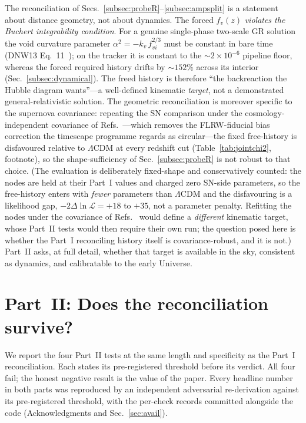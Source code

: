 \documentclass[aps,prd,twocolumn,nofootinbib,superscriptaddress,floatfix]{revtex4-2}
\newcommand{\fvz}{f_{v}(z)}
\newcommand{\Lcdm}{\Lambda\mathrm{CDM}}
\begin{document}
The reconciliation of Secs.~\ref{subsec:probeR}--\ref{subsec:ampsplit} is a
statement about distance geometry, not about dynamics. The forced $\fvz$
\emph{violates the Buchert integrability condition}. For a genuine single-phase
two-scale GR solution the void curvature parameter
$\alpha^{2}=-k_v\,f_{vi}^{2/3}$ must be constant in bare time
(DNW13 Eq.~11~\cite{Duley2013}); on the tracker it is constant to the
$\sim\!2\times10^{-6}$ pipeline floor, whereas the forced required history drifts
by $\sim\!152\%$ across its interior (Sec.~\ref{subsec:dynamical}). The freed
history is therefore ``the backreaction the Hubble diagram wants''---a
well-defined kinematic \emph{target}, not a demonstrated general-relativistic
solution. The geometric reconciliation is moreover specific to the supernova
covariance: repeating the SN comparison under the cosmology-independent covariance
of Refs.~\cite{Lane2025,Seifert2024}---which removes the FLRW-fiducial bias
correction the timescape programme regards as circular---the fixed free-history is
disfavoured relative to $\Lcdm$ at every redshift cut
(Table~\ref{tab:jointchi2}, footnote), so the shape-sufficiency of
Sec.~\ref{subsec:probeR} is not robust to that choice. (The evaluation is
deliberately fixed-shape and conservatively counted: the nodes are held at their
Part~I values and charged zero SN-side parameters, so the free-history enters
with \emph{fewer} parameters than $\Lcdm$ and the disfavouring is a likelihood
gap, $-2\Delta\ln\mathcal{L}=+18$ to $+35$, not a parameter penalty. Refitting
the nodes under the covariance of Refs.~\cite{Lane2025,Seifert2024} would define
a \emph{different} kinematic target, whose Part~II tests would then require
their own run; the question posed here is whether the Part~I reconciling
history itself is covariance-robust, and it is not.) Part~II asks, at full detail, whether that target is available in the
sky, consistent as dynamics, and calibratable to the early Universe.

\section{Part~II: Does the reconciliation survive?}
\label{sec:partii}

We report the four Part~II tests at the same length and specificity as the
Part~I reconciliation. Each states its pre-registered threshold before its
verdict. All four fail; the honest negative result is the value of the paper. Every
headline number in both parts was reproduced by an independent adversarial
re-derivation against its pre-registered threshold, with the per-check records
committed alongside the code (Acknowledgments and Sec.~\ref{sec:avail}).
\end{document}
